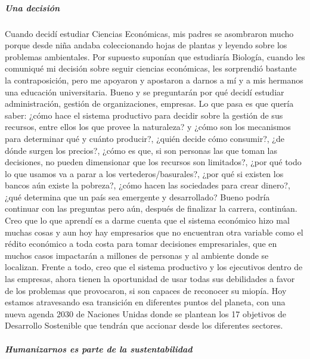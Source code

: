 \documentclass[
]{article}
\begin{document}
\hypertarget{una-decisiuxf3n}{%
\subparagraph{Una decisión}\label{una-decisiuxf3n}}

Cuando decidí estudiar Ciencias Económicas, mis padres se asombraron
mucho porque desde niña andaba coleccionando hojas de plantas y leyendo
sobre los problemas ambientales. Por supuesto suponían que estudiaría
Biología, cuando les comuniqué mi decisión sobre seguir ciencias
económicas, les sorprendió bastante la contraposición, pero me apoyaron
y apostaron a darnos a mí y a mis hermanos una educación universitaria.
Bueno y se preguntarán por qué decidí estudiar administración, gestión
de organizaciones, empresas. Lo que pasa es que quería saber: ¿cómo hace
el sistema productivo para decidir sobre la gestión de sus recursos,
entre ellos los que provee la naturaleza? y ¿cómo son los mecanismos
para determinar qué y cuánto producir?, ¿quién decide cómo consumir?,
¿de dónde surgen los precios?, ¿cómo es que, si son personas las que
toman las decisiones, no pueden dimensionar que los recursos son
limitados?, ¿por qué todo lo que usamos va a parar a los
vertederos/basurales?, ¿por qué si existen los bancos aún existe la
pobreza?, ¿cómo hacen las sociedades para crear dinero?, ¿qué determina
que un país sea emergente y desarrollado? Bueno podría continuar con las
preguntas pero aún, después de finalizar la carrera, continúan.\\
Creo que lo que aprendí es a darme cuenta que el sistema económico hizo
mal muchas cosas y aun hoy hay empresarios que no encuentran otra
variable como el rédito económico a toda costa para tomar decisiones
empresariales, que en muchos casos impactarán a millones de personas y
al ambiente donde se localizan. Frente a todo, creo que el sistema
productivo y los ejecutivos dentro de las empresas, ahora tienen la
oportunidad de usar todas sus debilidades a favor de los problemas que
provocaron, si son capaces de reconocer su miopía. Hoy estamos
atravesando esa transición en diferentes puntos del planeta, con una
nueva agenda 2030 de Naciones Unidas donde se plantean los 17 objetivos
de Desarrollo Sostenible que tendrán que accionar desde los diferentes
sectores.

\hypertarget{humanizarnos-es-parte-de-la-sustentabilidad}{%
\subparagraph{Humanizarnos es parte de la
sustentabilidad}\label{humanizarnos-es-parte-de-la-sustentabilidad}}
\end{document}
